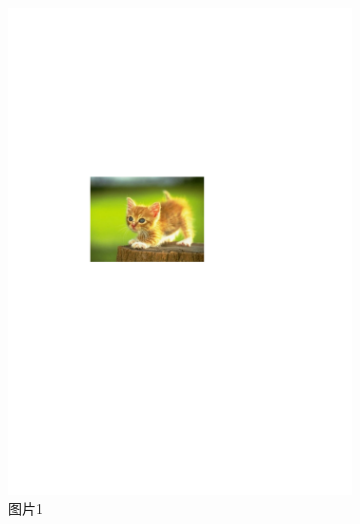 \documentclass[format=draft,language=chinese,category=SDN]{hustreport}
\begin{document}
\begin{figure}[!h]
\centering
  \begin{subfigure}[b]{0.3\textwidth}
  \includegraphics[width=\textwidth]{fig/fig-example.pdf}
  \caption{图片1}\label{fig:2-1}
  \end{subfigure}
  ~
  \begin{subfigure}[b]{0.3\textwidth}

\end{subfigure}
\end{figure}
\end{document}
